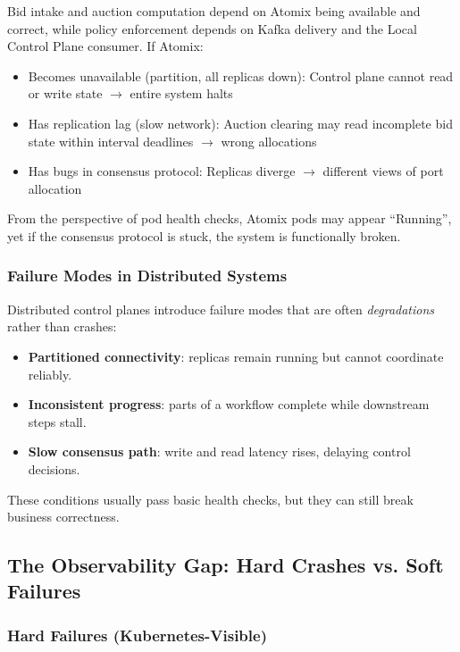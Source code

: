 Bid intake and auction computation depend on Atomix being available and correct, while policy enforcement depends on Kafka delivery and the Local Control Plane consumer. If Atomix:

\begin{itemize}
    \item Becomes unavailable (partition, all replicas down): Control plane cannot read or write state $\rightarrow$ entire system halts
    \item Has replication lag (slow network): Auction clearing may read incomplete bid state within interval deadlines $\rightarrow$ wrong allocations
    \item Has bugs in consensus protocol: Replicas diverge $\rightarrow$ different views of port allocation
\end{itemize}

From the perspective of pod health checks, Atomix pods may appear ``Running'', yet if the consensus protocol is stuck, the system is functionally broken.

\subsubsection{Failure Modes in Distributed Systems}

Distributed control planes introduce failure modes that are often \textit{degradations} rather than crashes:

\begin{itemize}
    \item \textbf{Partitioned connectivity}: replicas remain running but cannot coordinate reliably.
    \item \textbf{Inconsistent progress}: parts of a workflow complete while downstream steps stall.
    \item \textbf{Slow consensus path}: write and read latency rises, delaying control decisions.
\end{itemize}

These conditions usually pass basic health checks, but they can still break business correctness.

\subsection{The Observability Gap: Hard Crashes vs. Soft Failures}

\subsubsection{Hard Failures (Kubernetes-Visible)}

